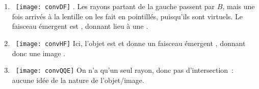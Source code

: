 \documentclass[../TDO3.tex]{subfiles}%
\begin{document}
{\begin{multicols}{2}
\begin{enumerate}[leftmargin=20pt, label=\alph* --]
            Ici, l'objet est  mais donne un faisceau émergent
            , donnant donc une image .
      \item ~\smallbreak\texttt{[image: convDF]}
            . Les rayons partant de la
            gauche passent par $B$, mais une fois arrivés à la lentille on les
            fait en pointillés, puisqu'ils sont virtuels. Le faisceau émergent
            est , donnant lieu à une .
            \columnbreak
      \item ~\smallbreak\texttt{[image: convHF]}
            Ici, l'objet est  et donne un faisceau émergent
            , donnant donc une image .
      \item ~\smallbreak\texttt{[image: convQQE]}
            On n'a qu'un seul rayon, donc pas d'intersection~: aucune idée de la
            nature de l'objet/image.
    \end{enumerate}
  \end{multicols}
}
\end{document}
